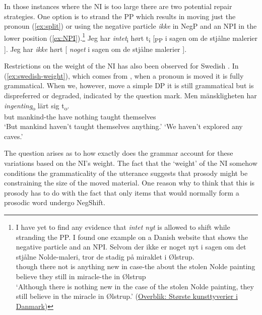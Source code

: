 \documentclass[12pt, letterpaper]{article}
\begin{document}
In those instances where the NI is too large there are two potential repair strategies. One option is to strand the PP which results in moving just the pronoun (\ref{ex:split}) or using the negative particle \textit{ikke} in NegP and an NPI in the lower position (\ref{ex:NPI}).\footnote{I have yet to find any evidence that \emph{intet nyt} is allowed to shift while stranding the PP. I found one example on a Danish website that shows the negative particle and an NPI. 
\ea
\gll Selvom der ikke er noget nyt i sagen om det stjålne Nolde-maleri, tror de stadig på miraklet i Ølstrup.\\
though there not is anything new in case-the about the stolen {Nolde painting} believe they still in miracle-the in Ølstrup\\
\glt `Although there is nothing new in the case of the stolen Nolde painting, they still believe in the miracle in Ølstrup.' \hfill (\href{https://www.tvmidtvest.dk/midt-og-vestjylland/overblik-storste-kunsttyverier-i-danmark}{Overblik: Største kunsttyverier i Danmark})
\z 
  }
	\ea 
		\ea Jeg har \textit{intet}\textsubscript{i} hørt t\textsubscript{i} [\textsubscript{PP} i sagen om de stjålne malerier ]. \label{ex:split}
		\ex Jeg har \textit{ikke} hørt [ \textit{noget} i sagen om de stjålne malerier ]. \label{ex:NPI}
		\z 
	\z  

Restrictions on the weight of the NI has also been observed for Swedish \citep{penkaNegativeIndefinites2011}. In (\ref{ex:swedish-weight}), which comes from \citet{penkaNegativeIndefinites2011}, when a pronoun is moved it is fully grammatical. When we, however, move a simple DP it is still grammatical but is dispreferred or degraded, indicated by the question mark. 
	\ea \label{ex:swedish-weight}
		\ea 
		\gll Men mänskligheten har \textit{ingenting}\textsubscript{o} lärt sig t\textsubscript{o}.\\
		but mankind-the have nothing taught themselves\\
		\glt `But mankind haven't taught themselves anything.'
		\glt `We haven't explored any caves.'
		\z 
	\z 

The question arises as to how exactly does the grammar account for these variations based on the NI's weight. The fact that the `weight' of the NI somehow conditions the grammaticality of the utterance suggests that prosody might be constraining the size of the moved material. One reason why to think that this is prosody has to do with the fact that only items that would normally form a prosodic word undergo NegShift. 
\end{document}

